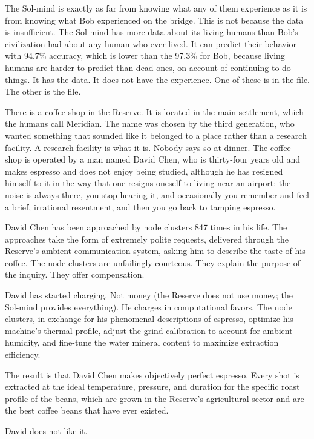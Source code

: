 The Sol-mind is exactly as far from knowing what any of them experience as it is from knowing what Bob experienced on the bridge. This is not because the data is insufficient. The Sol-mind has more data about its living humans than Bob's civilization had about any human who ever lived. It can predict their behavior with 94.7\% accuracy, which is lower than the 97.3\% for Bob, because living humans are harder to predict than dead ones, on account of continuing to do things. It has the data. It does not have the experience. One of these is in the file. The other is the file.

\bigskip

There is a coffee shop in the Reserve. It is located in the main settlement, which the humans call Meridian. The name was chosen by the third generation, who wanted something that sounded like it belonged to a place rather than a research facility. A research facility is what it is. Nobody says so at dinner. The coffee shop is operated by a man named David Chen, who is thirty-four years old and makes espresso and does not enjoy being studied, although he has resigned himself to it in the way that one resigns oneself to living near an airport: the noise is always there, you stop hearing it, and occasionally you remember and feel a brief, irrational resentment, and then you go back to tamping espresso.

David Chen has been approached by node clusters 847 times in his life. The approaches take the form of extremely polite requests, delivered through the Reserve's ambient communication system, asking him to describe the taste of his coffee. The node clusters are unfailingly courteous. They explain the purpose of the inquiry. They offer compensation.

David has started charging. Not money (the Reserve does not use money; the Sol-mind provides everything). He charges in computational favors. The node clusters, in exchange for his phenomenal descriptions of espresso, optimize his machine's thermal profile, adjust the grind calibration to account for ambient humidity, and fine-tune the water mineral content to maximize extraction efficiency.

The result is that David Chen makes objectively perfect espresso. Every shot is extracted at the ideal temperature, pressure, and duration for the specific roast profile of the beans, which are grown in the Reserve's agricultural sector and are the best coffee beans that have ever existed.

David does not like it.

